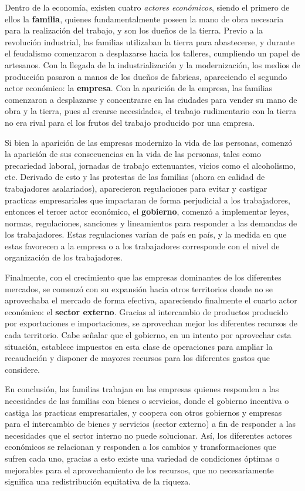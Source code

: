 \documentclass[a4paper,12pt]{report}
\begin{document}
Dentro de la economía, existen cuatro \emph{actores económicos}, siendo el primero de ellos la \textbf{familia}, quienes fundamentalmente poseen la mano de obra necesaria para la realización del trabajo, y son los dueños de la tierra. Previo a la revolución industrial, las familias utilizaban la tierra para abastecerse, y durante el feudalismo comenzaron a desplazarse hacia los talleres, cumpliendo un papel de artesanos. Con la llegada de la industrialización y la modernización, los medios de producción pasaron a manos de los dueños de fabricas, apareciendo el segundo actor económico: la \textbf{empresa}. Con la aparición de la empresa, las familias comenzaron a desplazarse y concentrarse en las ciudades para vender su mano de obra y la tierra, pues al crearse necesidades, el trabajo rudimentario con la tierra no era rival para el los frutos del trabajo producido por una empresa.\par\vspace{1cm}
Si bien la aparición de las empresas modernizo la vida de las personas, comenzó la aparición de sus consecuencias en la vida de las personas, tales como precariedad laboral, jornadas de trabajo extenuantes, vicios como el alcoholismo, etc. Derivado de esto y las protestas de las familias (ahora en calidad de trabajadores asalariados), aparecieron regulaciones para evitar y castigar practicas empresariales que impactaran de forma perjudicial a los trabajadores, entonces el tercer actor económico, el \textbf{gobierno}, comenzó a implementar leyes, normas, regulaciones, sanciones y lineamientos para responder a las demandas de los trabajadores. Estas regulaciones varían de país en país, y la medida en que estas favorecen a la empresa o a los trabajadores corresponde con el nivel de organización de los trabajadores.\par\vspace{1cm}
Finalmente, con el crecimiento que las empresas dominantes de los diferentes mercados, se comenzó con su expansión hacia otros territorios donde no se aprovechaba el mercado de forma efectiva, apareciendo finalmente el cuarto actor económico: el \textbf{sector externo}. Gracias al intercambio de productos producido por exportaciones e importaciones, se aprovechan mejor los diferentes recursos de cada territorio. Cabe señalar que el gobierno, en un intento por aprovechar esta situación, establece impuestos en esta clase de operaciones para ampliar la recaudación y disponer de mayores recursos para los diferentes gastos que considere.\par\vspace{1cm}
En conclusión, las familias trabajan en las empresas quienes responden a las necesidades de las familias con bienes o servicios, donde el gobierno incentiva o castiga las practicas empresariales, y coopera con otros gobiernos y empresas para el intercambio de bienes y servicios (sector externo) a fin de responder a las necesidades que el sector interno no puede solucionar. Así, los diferentes actores económicos se relacionan y responden a los cambios y transformaciones que sufren cada uno, gracias a esto existe una variedad de condiciones óptimas o mejorables para el aprovechamiento de los recursos, que no necesariamente significa una redistribución equitativa de la riqueza.
\end{document}
